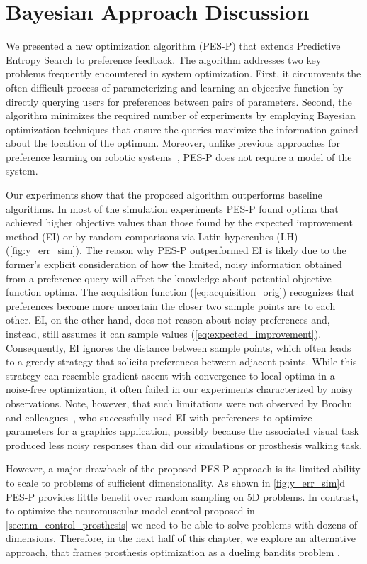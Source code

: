 \section{Bayesian Approach Discussion}\label{sec:tuning_discussion}
We presented a new optimization algorithm (PES-P) that extends Predictive
Entropy Search to preference feedback. The algorithm addresses two key problems
frequently encountered in system optimization. First, it circumvents the often
difficult process of parameterizing and learning an objective function by
directly querying users for preferences between pairs of parameters. Second, the
algorithm minimizes the required number of experiments by employing Bayesian
optimization techniques that ensure the queries maximize the information gained
about the location of the optimum. Moreover, unlike previous approaches for
preference learning on robotic systems~\citep{wilson2012bayesian,
jain2013learning}, PES-P does not require a model of the system.

Our experiments show that the proposed algorithm outperforms baseline
algorithms. In most of the simulation experiments PES-P found optima that
achieved higher objective values than those found by the expected improvement
method (EI) or by random comparisons via Latin hypercubes (LH)
(\cref{fig:y_err_sim}). The reason why PES-P outperformed EI is likely due to
the former's explicit consideration of how the limited, noisy information
obtained from a preference query will affect the knowledge about potential
objective function optima. The acquisition function (\cref{eq:acquisition_orig})
recognizes that preferences become more uncertain the closer two sample points
are to each other. EI, on the other hand, does not reason about noisy
preferences and, instead, still assumes it can sample values
(\cref{eq:expected_improvement}). Consequently, EI ignores the distance between
sample points, which often leads to a greedy strategy that solicits preferences
between adjacent points. While this strategy can resemble gradient ascent with
convergence to local optima in a noise-free optimization, it often failed in our
experiments characterized by noisy observations. Note, however, that such
limitations were not observed by Brochu and colleagues~\citep{eric2008active},
who successfully used EI with preferences to optimize parameters for a graphics
application, possibly because the associated visual task produced less noisy
responses than did our simulations or prosthesis walking task. 

However, a major drawback of the proposed PES-P approach is its limited ability
to scale to problems of sufficient dimensionality. As shown in
\cref{fig:y_err_sim}d PES-P provides little benefit over random sampling on 5D
problems. In contrast, to optimize the neuromuscular model control proposed in
\cref{sec:nm_control_prosthesis} we need to be able to solve problems with
dozens of dimensions. Therefore, in the next half of this chapter, we explore an
alternative approach, that frames prosthesis optimization as a dueling bandits
problem \citep{yue2012k}.
